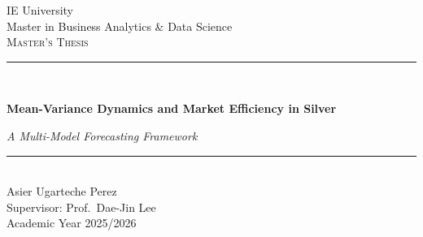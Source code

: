 \documentclass[12pt, a4paper]{article}
\begin{document}
\hypersetup{pageanchor=false}

\begin{titlepage}
    \centering
    \vspace*{1.2cm}

    {\large IE University} \\[0.25cm]
    {\large Master in Business Analytics \& Data Science} \\[2.6cm]

    {\large\scshape Master's Thesis} \\[1.0cm]

    \rule{\textwidth}{0.4pt} \\[0.65cm]
    {\LARGE\bfseries Mean-Variance Dynamics and Market Efficiency in Silver\par}
    \vspace{0.7cm}
    {\large\itshape A Multi-Model Forecasting Framework\par}
    \vspace{0.55cm}
    \rule{\textwidth}{0.4pt} \\[2.4cm]

    {\large Asier Ugarteche Perez} \\[1.6cm]

    {\normalsize Supervisor: Prof.\ Dae-Jin Lee} \\[0.4cm]

    \vfill
    {\normalsize Academic Year 2025/2026}
\end{titlepage}
\thispagestyle{empty}
\end{document}

